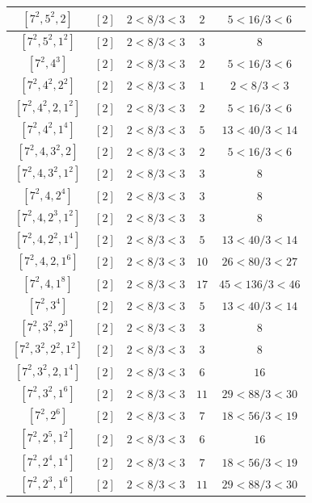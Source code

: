 \documentclass{article}%
\begin{document}
\begin{center}
\begin{longtable}{||c|c|c|c|c||}
$[7^{2}, 5^{2}, 2]$ & $[2]$ & $2 < 8/3 < 3$ & $2$ & $5 < 16/3 < 6$ \\ \hline 
$[7^{2}, 5^{2}, 1^{2}]$ & $[2]$ & $2 < 8/3 < 3$ & $3$ & $8$ \\ \hline 
$[7^{2}, 4^{3}]$ & $[2]$ & $2 < 8/3 < 3$ & $2$ & $5 < 16/3 < 6$ \\ \hline 
$[7^{2}, 4^{2}, 2^{2}]$ & $[2]$ & $2 < 8/3 < 3$ & $1$ & $2 < 8/3 < 3$ \\ \hline 
$[7^{2}, 4^{2}, 2, 1^{2}]$ & $[2]$ & $2 < 8/3 < 3$ & $2$ & $5 < 16/3 < 6$ \\ \hline 
$[7^{2}, 4^{2}, 1^{4}]$ & $[2]$ & $2 < 8/3 < 3$ & $5$ & $13 < 40/3 < 14$ \\ \hline 
$[7^{2}, 4, 3^{2}, 2]$ & $[2]$ & $2 < 8/3 < 3$ & $2$ & $5 < 16/3 < 6$ \\ \hline 
$[7^{2}, 4, 3^{2}, 1^{2}]$ & $[2]$ & $2 < 8/3 < 3$ & $3$ & $8$ \\ \hline 
$[7^{2}, 4, 2^{4}]$ & $[2]$ & $2 < 8/3 < 3$ & $3$ & $8$ \\ \hline 
$[7^{2}, 4, 2^{3}, 1^{2}]$ & $[2]$ & $2 < 8/3 < 3$ & $3$ & $8$ \\ \hline 
$[7^{2}, 4, 2^{2}, 1^{4}]$ & $[2]$ & $2 < 8/3 < 3$ & $5$ & $13 < 40/3 < 14$ \\ \hline 
$[7^{2}, 4, 2, 1^{6}]$ & $[2]$ & $2 < 8/3 < 3$ & $10$ & $26 < 80/3 < 27$ \\ \hline 
$[7^{2}, 4, 1^{8}]$ & $[2]$ & $2 < 8/3 < 3$ & $17$ & $45 < 136/3 < 46$ \\ \hline 
$[7^{2}, 3^{4}]$ & $[2]$ & $2 < 8/3 < 3$ & $5$ & $13 < 40/3 < 14$ \\ \hline 
$[7^{2}, 3^{2}, 2^{3}]$ & $[2]$ & $2 < 8/3 < 3$ & $3$ & $8$ \\ \hline 
$[7^{2}, 3^{2}, 2^{2}, 1^{2}]$ & $[2]$ & $2 < 8/3 < 3$ & $3$ & $8$ \\ \hline 
$[7^{2}, 3^{2}, 2, 1^{4}]$ & $[2]$ & $2 < 8/3 < 3$ & $6$ & $16$ \\ \hline 
$[7^{2}, 3^{2}, 1^{6}]$ & $[2]$ & $2 < 8/3 < 3$ & $11$ & $29 < 88/3 < 30$ \\ \hline 
$[7^{2}, 2^{6}]$ & $[2]$ & $2 < 8/3 < 3$ & $7$ & $18 < 56/3 < 19$ \\ \hline 
$[7^{2}, 2^{5}, 1^{2}]$ & $[2]$ & $2 < 8/3 < 3$ & $6$ & $16$ \\ \hline 
$[7^{2}, 2^{4}, 1^{4}]$ & $[2]$ & $2 < 8/3 < 3$ & $7$ & $18 < 56/3 < 19$ \\ \hline 
$[7^{2}, 2^{3}, 1^{6}]$ & $[2]$ & $2 < 8/3 < 3$ & $11$ & $29 < 88/3 < 30$ \\ \hline 

\end{longtable}
\end{center}
\end{document}
